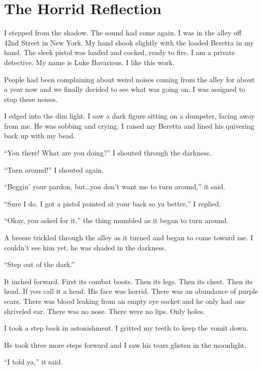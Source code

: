 \chapter{The Horrid Reflection}


I stepped from the shadow. The sound had come again. I was in the alley
off 42nd Street in New York. My hand shook slightly with the loaded
Beretta in my hand. The sleek pistol was loaded and cocked, ready to
fire. I am a private detective. My name is Luke Bavarious. I like this
work.

People had been complaining about weird noises coming from the alley for
about a year now and we finally decided to see what was going on. I was
assigned to stop these noises.

I edged into the dim light. I saw a dark figure sitting on a dumpster,
facing away from me. He was sobbing and crying. I raised my Beretta and
lined his quivering back up with my bead.

``You there! What are you doing?'' I shouted through the darkness.

``Turn around!'' I shouted again.

``Beggin' your pardon, but\ldots you don't want me to turn around,'' it
said.

``Sure I do. I got a pistol pointed at your back so ya better,'' I
replied.

``Okay, you asked for it,'' the thing mumbled as it began to turn around.

A breeze trickled through the alley as it turned and began to come
toward me. I couldn't see him yet, he was shaded in the darkness.

``Step out of the dark.''

It inched forward. First its combat boots. Then its legs. Then its
chest. Then its head. If you call it a head. His face was horrid. There
was an abundance of purple scars. There was blood leaking from an empty
eye socket and he only had one shriveled ear. There was no nose. There
were no lips. Only holes.

I took a step back in astonishment. I gritted my teeth to keep the vomit
down.

He took three more steps forward and I saw his tears glisten in the
moonlight.

``I told ya,'' it said.

